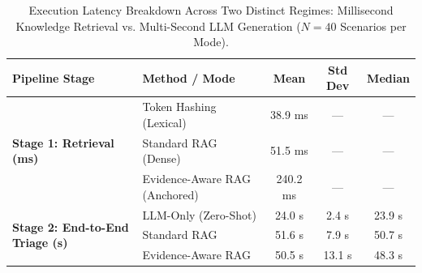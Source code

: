 \begin{table}[t]
\centering
\small
\caption{Execution Latency Breakdown Across Two Distinct Regimes: Millisecond Knowledge Retrieval vs. Multi-Second LLM Generation ($N = 40$ Scenarios per Mode).}
\label{tab:latency_results}
\begin{tabular}{llccc}
\toprule
\textbf{Pipeline Stage} & \textbf{Method / Mode} & \textbf{Mean} & \textbf{Std Dev} & \textbf{Median} \\
\midrule
\multirow{3}{*}{\textbf{Stage 1: Retrieval (ms)}}
    & Token Hashing (Lexical) & 38.9 ms & --- & --- \\
    & Standard RAG (Dense) & 51.5 ms & --- & --- \\
    & Evidence-Aware RAG (Anchored) & 240.2 ms & --- & --- \\
\midrule
\multirow{3}{*}{\textbf{Stage 2: End-to-End Triage (s)}}
    & LLM-Only (Zero-Shot) & 24.0 s & 2.4 s & 23.9 s \\
    & Standard RAG & 51.6 s & 7.9 s & 50.7 s \\
    & Evidence-Aware RAG & 50.5 s & 13.1 s & 48.3 s \\
\bottomrule
\end{tabular}
\end{table}
